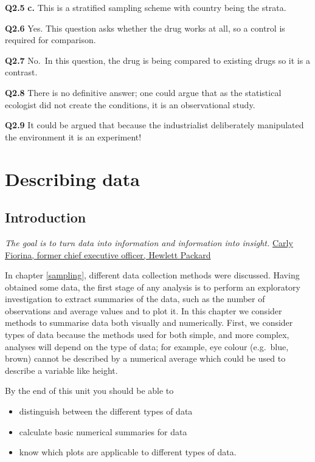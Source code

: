 \documentclass[
  oneside]{krantz}
\begin{document}
\textbf{Q2.5} \textbf{c.} This is a stratified sampling scheme with country being the strata.

\textbf{Q2.6} Yes. This question asks whether the drug works at all, so a control is required for comparison.

\textbf{Q2.7} No.~In this question, the drug is being compared to existing drugs so it is a contrast.

\textbf{Q2.8} There is no definitive answer; one could argue that as the statistical ecologist did not create the conditions, it is an observational study.

\textbf{Q2.9} It could be argued that because the industrialist deliberately manipulated the environment it is an experiment!

\hypertarget{describedata}{%
\chapter{Describing data}\label{describedata}}

\hypertarget{INTdata}{%
\section{Introduction}\label{INTdata}}

\emph{The goal is to turn data into information and information into insight.}
\href{http://www.hp.com/hpinfo/execteam/speeches/fiorina/04openworld.html}{Carly Fiorina, former chief executive officer, Hewlett Packard}

In chapter \ref{sampling}, different data collection methods were discussed. Having obtained some data, the first stage of any analysis is to perform an exploratory investigation to extract summaries of the data, such as the number of observations and average values and to plot it. In this chapter we consider methods to summarise data both visually and numerically. First, we consider types of data because the methods used for both simple, and more complex, analyses will depend on the type of data; for example, eye colour (e.g.~blue, brown) cannot be described by a numerical average which could be used to describe a variable like height.

By the end of this unit you should be able to

\begin{itemize}
\item
  distinguish between the different types of data
\item
  calculate basic numerical summaries for data
\item
  know which plots are applicable to different types of data.
\end{itemize}
\end{document}
